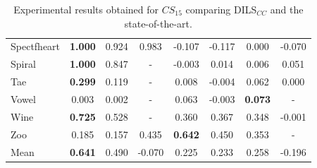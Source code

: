 \documentclass[review]{elsarticle}
\begin{document}
\begin{table}[!h]
{\begin{tabular}{lccccccc}
			Spectfheart & \textbf{1.000} & 0.924 & 0.983 & -0.107 & -0.117 & 0.000 & -0.070 \\
			Spiral & \textbf{1.000} & 0.847 & - & -0.003 & 0.014 & 0.006 & 0.051 \\
			Tae & \textbf{0.299} & 0.119 & - & 0.008 & -0.004 & 0.062 & 0.000 \\
			Vowel & 0.003 & 0.002 & - & 0.063 & -0.003 & \textbf{0.073} & - \\
			Wine & \textbf{0.725} & 0.528 & - & 0.360 & 0.367 & 0.348 & -0.001 \\
			Zoo & 0.185 & 0.157 & 0.435 & \textbf{0.642} & 0.450 & 0.353 & - \\
			\hline
			Mean & \textbf{0.641} & 0.490 & -0.070 & 0.225 & 0.233 & 0.258 & -0.196 \\
			\hline
			
		\end{tabular}}
		
		\caption{Experimental results obtained for $CS_{15}$ comparing DILS$_{CC}$ and the state-of-the-art.}
		\label{tab:results15}
	\end{table}
\end{document}

